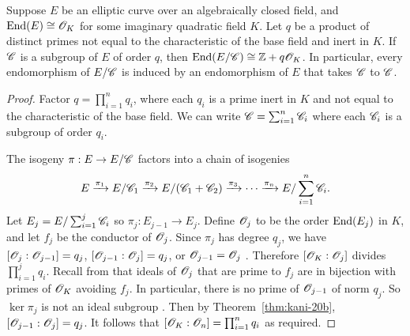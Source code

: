 \documentclass{amsart}
\begin{document}
\begin{lemma}\label{lem:c-end}
  Suppose $E$ be an elliptic curve over an algebraically closed field, and $\operatorname{End}(E) \cong \mathscr{O}_K$ for some imaginary quadratic field $K$. Let $q$ be a product of distinct primes not equal to the characteristic of the base field and inert in $K$. If $\mathscr{C}$ is a subgroup of $E$ of order $q$, then $\operatorname{End}(E/\mathscr{C}) \cong \mathbb{Z} + q\mathscr{O}_K$. In particular, every endomorphism of $E/\mathscr{C}$ is induced by an endomorphism of $E$ that takes $\mathscr{C}$ to $\mathscr{C}$.
\end{lemma}
\begin{proof}
  Factor $q = \prod_{i=1}^n q_i$, where each $q_i$ is a prime inert in $K$ and not equal to the characteristic of the base field. We can write $\mathscr{C} = \sum_{i=1}^n \mathscr{C}_i$ where each $\mathscr{C}_i$ is a subgroup of order $q_i$.

  The isogeny $\pi: E \to E/\mathscr{C}$ factors into a chain of isogenies
  \[
    E
    \xrightarrow{\pi_1}
    E/\mathscr{C}_1
    \xrightarrow{\pi_2}
    E/(\mathscr{C}_1 + \mathscr{C}_2)
    \xrightarrow{\pi_3}
    \cdots
    \xrightarrow{\pi_n}
    E/\sum_{i=1}^n\mathscr{C}_i.
  \]
  Let $E_j = E/\sum_{i=1}^j\mathscr{C}_i$ so $\pi_j: E_{j-1} \to E_j$. Define $\mathscr{O}_j$ to be the order $\operatorname{End}(E_j)$ in $K$, and let $f_j$ be the conductor of $\mathscr{O}_j$. Since $\pi_j$ has degree $q_j$, we have $[\mathscr{O}_j : \mathscr{O}_{j-1}] = q_j$, $[\mathscr{O}_{j-1} : \mathscr{O}_j] = q_j$, or $\mathscr{O}_{j-1} = \mathscr{O}_j$ \cite[Prop.~5]{kohel1996endomorphism}. Therefore $[\mathscr{O}_K : \mathscr{O}_j]$ divides $\prod_{i=1}^{j}q_i$. Recall from \cite[Prop.~7.20]{cox2011primes} that ideals of $\mathscr{O}_j$ that are prime to $f_j$ are in bijection with primes of $\mathscr{O}_K$ avoiding $f_j$. In particular, there is no prime of $\mathscr{O}_{j-1}$ of norm $q_j$. So $\ker\pi_j$ is not an ideal subgroup \cite[Prop.~23]{kani2011products}. Then by Theorem~\ref{thm:kani-20b}, $[\mathscr{O}_{j-1} : \mathscr{O}_j] = q_j$. It follows that $[\mathscr{O}_K : \mathscr{O}_n] = \prod_{i=1}^n q_i$ as required.
\end{proof}
\end{document}
